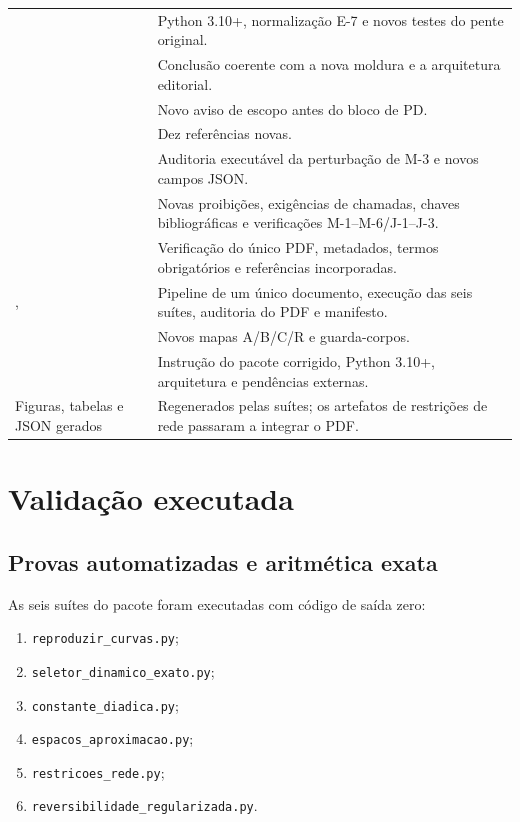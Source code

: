 \documentclass[11pt,a4paper]{article}
\begin{document}
\begin{longtable}{L{0.38\textwidth}L{0.51\textwidth}}
 & Python 3.10+, normalização E-7 e
novos testes do pente original.\\
 & Conclusão coerente com a nova moldura e a
arquitetura editorial.\\
 & Novo aviso de escopo antes do bloco de PD.\\
 & Dez referências novas.\\
 & Auditoria executável da
perturbação de M-3 e novos campos JSON.\\
 & Novas proibições, exigências de chamadas, chaves
bibliográficas e verificações M-1--M-6/J-1--J-3.\\
 & Verificação do único PDF, metadados, termos obrigatórios
e referências incorporadas.\\
,  & Pipeline de um único documento, execução das
seis suítes, auditoria do PDF e manifesto.\\
 & Novos mapas A/B/C/R e guarda-corpos.\\
 & Instrução do pacote corrigido, Python 3.10+, arquitetura e pendências
externas.\\
Figuras, tabelas e JSON gerados & Regenerados pelas suítes; os artefatos de restrições de
rede passaram a integrar o PDF.\\
\bottomrule
\end{longtable}

\section{Validação executada}

\subsection{Provas automatizadas e aritmética exata}

As seis suítes do pacote foram executadas com código de saída zero:
\begin{enumerate}
  \item \texttt{reproduzir\_curvas.py};
  \item \texttt{seletor\_dinamico\_exato.py};
  \item \texttt{constante\_diadica.py};
  \item \texttt{espacos\_aproximacao.py};
  \item \texttt{restricoes\_rede.py};
  \item \texttt{reversibilidade\_regularizada.py}.
\end{enumerate}
\end{document}
